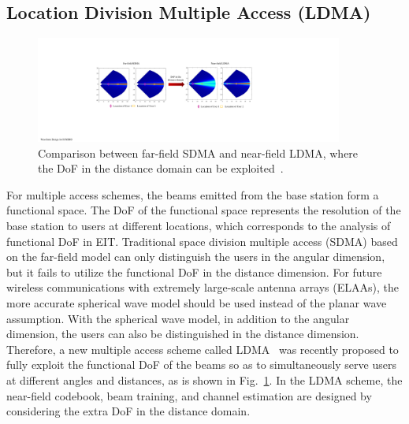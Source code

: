\documentclass[journal,twocolumn]{IEEEtran}
\begin{document}

\subsection{Location Division Multiple Access (LDMA)}
\begin{figure}[t]
	\centering 
	\includegraphics[width=0.9\textwidth]{figures/LDMA.pdf} 
	\caption{Comparison between far-field SDMA and near-field LDMA, where the DoF in the distance domain can be exploited~\cite{wu2022multiple}. }
	\label{fig:LDMA}
\end{figure}

For multiple access schemes, the beams emitted from the base station form a functional space. 
The DoF of the functional space represents the resolution of the base station to users at different locations, which corresponds to the analysis of functional DoF in EIT. 	%
Traditional space division multiple access (SDMA) based on the far-field model can only distinguish the users in the angular dimension, but it fails to utilize the functional DoF in the distance dimension. 
For future wireless communications with extremely large-scale antenna arrays (ELAAs), the more accurate spherical wave model should be used instead of the planar wave assumption. 
With the spherical wave model, in addition to the angular dimension, the users can also be distinguished in the distance dimension. 
Therefore, a new multiple access scheme called LDMA~\cite{wu2022multiple} was recently proposed to fully exploit the functional DoF of the beams so as to simultaneously serve users at different angles and distances, as is shown in Fig.~\ref{fig:LDMA}. 
In the LDMA scheme, the near-field codebook, beam training, and channel estimation are designed by considering the extra DoF in the distance domain. 
\end{document}
